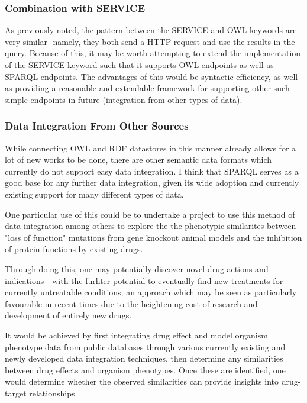 \documentclass{article}
\begin{document}
\subsubsection{Combination with SERVICE}

As previously noted, the pattern between the SERVICE and OWL keywords are very
similar- namely, they both send a HTTP request and
use the results in the query. Because of this, it may be worth attempting to
extend the implementation of the SERVICE keyword such
that it supports OWL endpoints as well as SPARQL endpoints. The advantages of
this would be syntactic efficiency, as well as providing
a reasonable and extendable framework for supporting other such simple endpoints
in future (integration from other types of data).

\subsubsection{Data Integration From Other Sources}

While connecting OWL and RDF datastores in this manner already allows for a lot
of new
works to be done, there are other semantic data
formats which currently do not support easy data integration. I think that
SPARQL serves
as a good base for any further data integration,
given its wide adoption and currently existing support for many different types
of data.

One particular use of this could be to undertake a project to use this method of
data
integration among others to explore the the phenotypic similarites between "loss
of
function" mutations from gene knockout animal models and the inhibition of
protein
functions by existing drugs.

Through doing this, one may potentially discover novel drug actions and
indications -
with the furhter potential to eventually find new treatments for currently
untreatable
conditions; an approach which may be seen as particularly favourable in recent
times
due to the heightening cost of research and development of entirely new drugs.

It would be achieved by first integrating drug effect and model organism
phenotype data
from public databases through various currently existing and newly developed
data
integration techniques, then determine any similarities between drug effects and
organism phenotypes. Once these are identified, one would determine whether the
observed similarities can provide insights into drug-target relationships.
\end{document}

